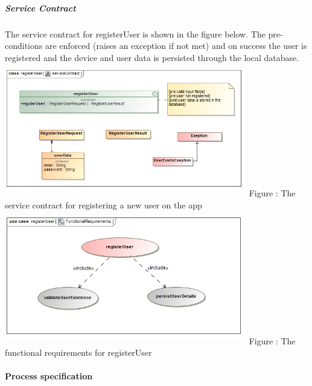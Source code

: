 \documentclass[hidelinks, 12pt, oneside]{article}
\begin{document}
	\subparagraph{Service Contract}
		The service contract for registerUser is shown in the figure below. The pre-conditions are enforced (raises an exception if not met) and on
		success the user is registered and the device and user data is persisted through the local database.\newline
	\includegraphics[width=400px,height=220px]{img/serviceContractRegisterUser.jpg}
		Figure : The service contract for registering a new user on the app\newline
	\includegraphics[width=400px,height=220px]{img/functionalRequirementsRegister.jpg}
		Figure : The functional requirements for registerUser\newline
		\paragraph{Process specification}
\end{document}

